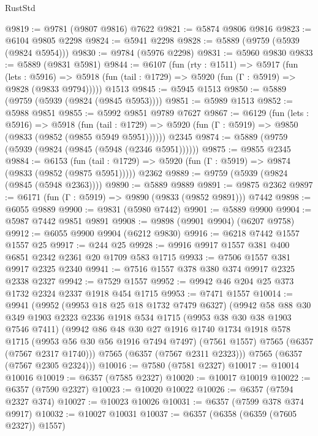 \begin{lexlean}{RustStd}
\begin{coremodule}
@9819 := @9781 (@9807 @9816) @7622
@9821 := @5874 @9806 @9816
@9823 := @6104 @9805 @2298
@9824 := @5941 @2298
@9828 := @5889 (@9759 (@5939 (@9824 @5954)))
@9830 := @9784 (@5976 @2298)
@9831 := @5960 @9830
@9833 := @5889 (@9831 @5981)
@9844 := @6107
    (fun (rty : @1511) =>
    @5917
      (fun (lets : @5916) =>
      @5918 (fun (tail : @1729) => @5920 (fun (Γ : @5919) => @9828 (@9833 @9794)))))
    @1513
@9845 := @5945 @1513
@9850 := @5889 (@9759 (@5939 (@9824 (@9845 @5953))))
@9851 := @5989 @1513
@9852 := @5988 @9851
@9855 := @5992 @9851 @9789 @7627
@9867 := @6129
    (fun (lets : @5916) =>
    @5918
      (fun (tail : @1729) => @5920 (fun (Γ : @5919) => @9850 (@9833 (@9852 (@9855 @5949 @5951))))))
    @2345
@9874 := @5889 (@9759 (@5939 (@9824 (@9845 (@5948 (@2346 @5951))))))
@9875 := @9855 @2345
@9884 := @6153
    (fun (tail : @1729) => @5920 (fun (Γ : @5919) => @9874 (@9833 (@9852 (@9875 @5951)))))
    @2362
@9889 := @9759 (@5939 (@9824 (@9845 (@5948 @2363))))
@9890 := @5889 @9889
@9891 := @9875 @2362
@9897 := @6171 (fun (Γ : @5919) => @9890 (@9833 (@9852 @9891))) @7442
@9898 := @6055 @9889
@9900 := @9831 (@5980 @7442)
@9901 := @5889 @9900
@9904 := @5987 @7442 @9851 @9891
@9908 := @9898 (@9901 @9904) (@6207 @9758)
@9912 := @6055 @9900 @9904 (@6212 @9830)
@9916 := @6218 @7442 @1557 @1557 @25
@9917 := @244 @25
@9928 := @9916 @9917 @1557 @381 @400 @6851 @2342 @2361 @20 @1709 @583 @1715
@9933 := @7506 @1557 @381 @9917 @2325 @2340
@9941 := @7516 @1557 @378 @380 @374 @9917 @2325 @2338 @2327
@9942 := @7529 @1557
@9952 := @9942 @46 @204 @25 @373 @1732 @2324 @2337 @1918 @454 @1715
@9953 := @7471 @1557
@10014 := @9941
    (@9952
      (@9953 @18 @25 @18 @1732 @7479 @6327)
      (@9942
        @58
        @88
        @30
        @349
        @1903
        @2323
        @2336
        @1918
        @534
        @1715
        (@9953 @38 @30 @38 @1903 @7546 @7411)
        (@9942
          @86
          @48
          @30
          @27
          @1916
          @1740
          @1734
          @1918
          @578
          @1715
          (@9953 @56 @30 @56 @1916 @7494 @7497)
          (@7561 @1557)
          @7565
          (@6357 (@7567 @2317 @1740)))
        @7565
        (@6357 (@7567 @2311 @2323)))
      @7565
      (@6357 (@7567 @2305 @2324)))
@10016 := @7580 (@7581 @2327)
@10017 := @10014 @10016
@10019 := @6357 (@7585 @2327)
@10020 := @10017 @10019
@10022 := @6357 (@7590 @2327)
@10023 := @10020 @10022
@10026 := @6357 (@7594 @2327 @374)
@10027 := @10023 @10026
@10031 := @6357 (@7599 @378 @374 @9917)
@10032 := @10027 @10031
@10037 := @6357 (@6358 (@6359 (@7605 @2327)) @1557)

\end{coremodule}
\end{lexlean}
